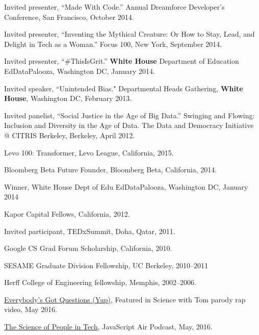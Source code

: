 \documentclass[11pt,article,oneside]{memoir}
\begin{document}
\ind Invited presenter, ``Made With Code.'' Annual Dreamforce Developer's Conference, San Francisco, October 2014.

\ind Invited presenter, ``Inventing the Mythical Creature: Or How to Stay, Lead, and Delight in Tech as a Woman.'' Focus 100, New York, September 2014.

\ind Invited presenter, ``\#ThisIsGrit.'' \textbf{White House} Department of Education EdDataPalooza, Washington DC, January 2014.

\ind Invited speaker, ``Unintended Bias." Departmental Heads Gathering, \textbf{White House}, Washington DC, February 2013.

\ind Invited panelist, ``Social Justice in the Age of Big Data.'' Swinging and Flowing: Inclusion and Diversity in the Age of Data. The Data and Democracy Initiative @ CITRIS Berkeley, Berkeley, April 2012.

\bigskip 

\medskip

\ind Levo 100: Transformer, Levo League, California, 2015.

\ind Bloomberg Beta Future Founder, Bloomberg Beta, California, 2014. 

\ind Winner, White House Dept of Edu EdDataPalooza, Washington DC, January 2014

\ind Kapor Capital Fellows, California, 2012.

\ind Invited participant, TEDxSummit, Doha, Qatar, 2011.

\ind Google CS Grad Forum Scholarship, California, 2010.

\ind SESAME Graduate Division Fellowship, UC Berkeley, 2010--2011

\ind Herff College of Engineering fellowship, Memphis, 2002--2006.

\bigskip 

\medskip

\ind \href{https://www.youtube.com/watch?v=q5mmE05e82I&ab_channel=ScienceWithTom}{Everybody's Got Questions (Yup)}, Featured in Science with Tom parody rap video, May 2016.

\ind \href{http://audio.javascriptair.com/e/022-jsair-the-science-of-people-in-tech-with-kate-edwards-omoju-miller-and-steve-andrews/}{The Science of People in Tech}, JavaScript Air Podcast, May, 2016.
\end{document}
